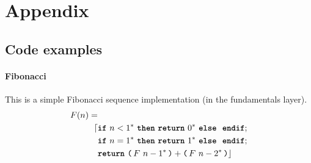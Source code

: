 \section{Appendix}
\subsection{Code examples}
\paragraph{Fibonacci}
This is a simple Fibonacci sequence implementation (in the fundamentals layer).
\begin{equation*}
\begin{split}
F(n) = & \\ \lceil
	&\ifstmt{n < 1^*}{\retstmt{0^*}}{};\\
	&\ifstmt{n = 1^*}{\retstmt{1^*}}{};\\
	&\retstmt{\opexp{F}{n - 1^*} + \opexp{F}{n - 2^*}} \rfloor
\end{split}
\end{equation*}